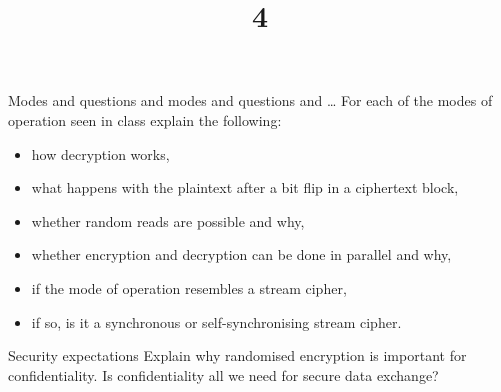 \documentclass{practice}
\title{4}
\date{\DTMdate{2024-10-02}}
\begin{document}
\maketitle

\begin{task}{Modes and questions and modes and questions and \dots}
  For each of the modes of operation seen in class explain the following:
  \begin{itemize}
    \item how decryption works,
    \item what happens with the plaintext after a bit flip in a ciphertext block,
    \item whether random reads are possible and why,
    \item whether encryption and decryption can be done in parallel and why,
    \item if the mode of operation resembles a stream cipher,
    \item if so, is it a synchronous or self-synchronising stream cipher.
  \end{itemize}
\end{task}

\begin{task}{Security expectations}
  Explain why randomised encryption is important for confidentiality.
  Is confidentiality all we need for secure data exchange?
\end{task}
\end{document}

